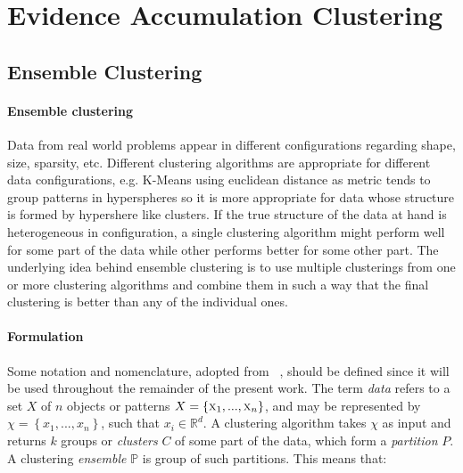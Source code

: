 \section{Evidence Accumulation Clustering}





\subsection{Ensemble Clustering}
\label{sec:eac}

\paragraph{Ensemble clustering}
Data from real world problems appear in different configurations regarding shape, size, sparsity, etc. %
Different clustering algorithms are appropriate for different data configurations, e.g. K-Means using euclidean distance as metric tends to group patterns in hyperspheres so it is more appropriate for data whose structure is formed by hypershere like clusters.%
If the true structure of the data at hand is heterogeneous in configuration, a single clustering algorithm might perform well for some part of the data while other performs better for some other part. The underlying idea behind ensemble clustering is to use multiple clusterings from one or more clustering algorithms and combine them in such a way that the final clustering is better than any of the individual ones.

\paragraph{Formulation}
Some notation and nomenclature, adopted from ~\cite{Fred2005}, should be defined since it will be used throughout the remainder of the present work. The term \emph{data} refers to a set $X$ of $n$ objects or patterns $X=\left \{ \textsc{x}_1,...,\textsc{x}_n \right \}$, and may be represented by $\chi = \left \{ x_1,...,x_n \right \}$, such that $x_i \in  \mathbb{R}^d$. A clustering algorithm takes $\chi$ as input and returns $k$ groups or \emph{clusters} $C$ of some part of the data, which form a \emph{partition} $P$. A clustering \emph{ensemble} $\mathbb{P}$ is group of such partitions. This means that:

